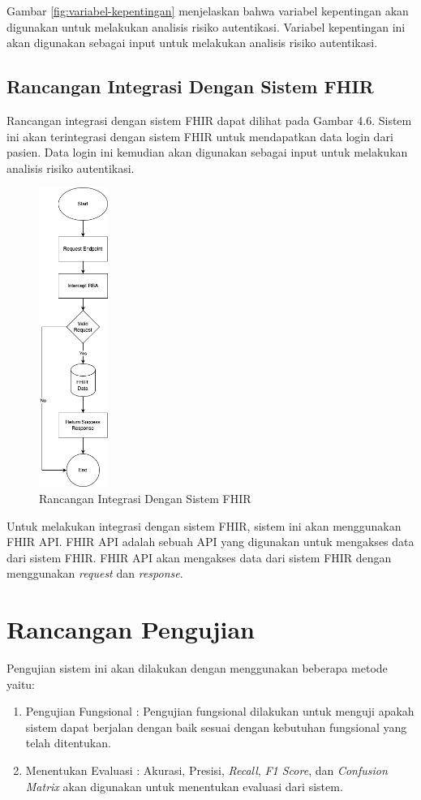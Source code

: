 Gambar \ref{fig:variabel-kepentingan} menjelaskan bahwa variabel kepentingan akan digunakan untuk melakukan analisis risiko autentikasi. Variabel kepentingan ini akan digunakan sebagai input untuk melakukan analisis risiko autentikasi.

\subsection{Rancangan Integrasi Dengan Sistem FHIR}
Rancangan integrasi dengan sistem FHIR dapat dilihat pada Gambar 4.6. Sistem ini akan terintegrasi dengan sistem FHIR untuk mendapatkan data login dari pasien. Data login ini kemudian akan digunakan sebagai input untuk melakukan analisis risiko autentikasi.
\begin{figure}[H]
    \centering
    \includegraphics[width=0.2\textwidth]{contents/chapter-4/fhir-rba.drawio.png}
    \caption{Rancangan Integrasi Dengan Sistem FHIR}
    \label{fig:integrasi}
\end{figure}

Untuk melakukan integrasi dengan sistem FHIR, sistem ini akan menggunakan FHIR API. FHIR API adalah sebuah API yang digunakan untuk mengakses data dari sistem FHIR. FHIR API akan mengakses data dari sistem FHIR dengan menggunakan \textit{request} dan \textit{response}.

\section{Rancangan Pengujian}
Pengujian sistem ini akan dilakukan dengan menggunakan beberapa metode yaitu:
\begin{enumerate}
    \item Pengujian Fungsional : Pengujian fungsional dilakukan untuk menguji apakah sistem dapat berjalan dengan baik sesuai dengan kebutuhan fungsional yang telah ditentukan.
    \item Menentukan Evaluasi : Akurasi, Presisi, \textit{Recall}, \textit{F1 Score}, dan \textit{Confusion Matrix} akan digunakan untuk menentukan evaluasi dari sistem.
\end{enumerate}
